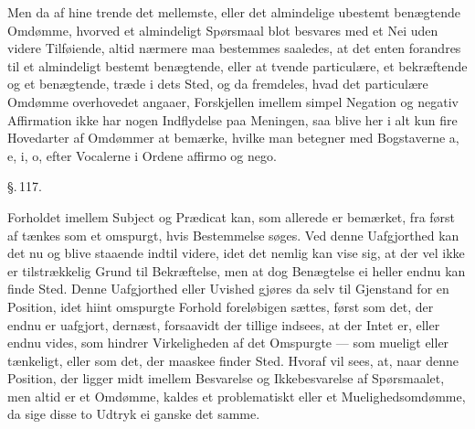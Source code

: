 \documentclass[12pt]{book}
\def\textit#1{#1}%
\def\emph#1{#1}%
\newcommand{\parag}[1]{%
  \par\vspace{0.9\baselineskip}%
  {\centering\textit{\S.\,#1.}\par}%
  \vspace{0.35\baselineskip}%
  \noindent\hspace{\parindent}\ignorespaces
}
\newcommand{\opage}[1]{\marginnote{\footnotesize\textit{[#1]}}}
\begin{document}
Men da af hine trende det mellemste, eller det almindelige ubestemt benægtende
Omdømme, hvorved et almindeligt Spørsmaal blot besvares med et Nei uden videre
Tilføiende, altid nærmere maa bestemmes saaledes, at det enten forandres til et
almindeligt bestemt benægtende, eller at tvende particulære, et bekræftende og et
benægtende, træde i dets Sted, og da fremdeles, hvad det particulære Omdømme
overhovedet angaaer, Forskjellen imellem simpel Negation og
\opage{281} negativ Affirmation ikke har nogen Indflydelse paa Meningen, saa blive her i alt kun
fire Hovedarter af Omdømmer at bemærke, hvilke man betegner med Bogstaverne
\textit{a}, \textit{e}, \textit{i}, \textit{o}, efter Vocalerne i Ordene
\textit{affirmo} og \textit{nego}.

\parag{117}

Forholdet imellem Subject og Prædicat kan, som allerede er bemærket, fra først af
tænkes som et omspurgt, hvis Bestemmelse søges. Ved denne Uafgjorthed kan det nu og
blive staaende indtil videre, idet det nemlig kan vise sig, at der vel ikke er
tilstrækkelig Grund til Bekræftelse, men at dog Benægtelse ei heller endnu kan finde
Sted. Denne Uafgjorthed eller Uvished gjøres da selv til Gjenstand for en Position,
idet hiint omspurgte Forhold foreløbigen sættes, først som det, der endnu er uafgjort,
dernæst, forsaavidt der tillige indsees, at der Intet er, eller endnu vides, som
hindrer Virkeligheden af det Omspurgte --- som \emph{mueligt eller tænkeligt}, eller
som det, der maaskee finder Sted. Hvoraf vil sees, at, naar denne Position, der ligger
midt imellem Besvarelse og Ikkebesvarelse af Spørsmaalet, men altid er et Omdømme,
kaldes et \emph{problematiskt eller et Muelighedsomdømme}, da sige disse to Udtryk ei
ganske det samme.
\end{document}
